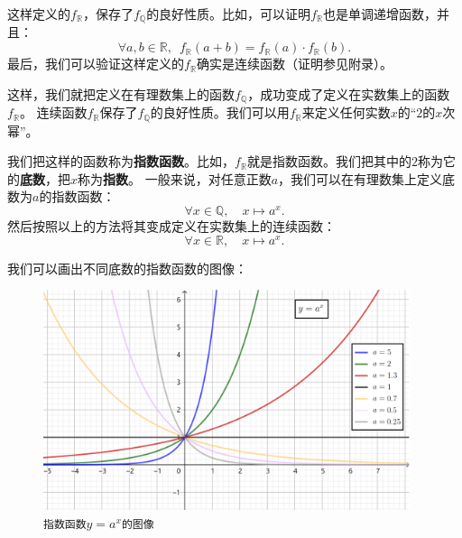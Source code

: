 \documentclass[12pt,UTF8]{ctexbook}
\begin{document}
这样定义的$f_{\mathbb{R}}$，保存了$f_{\mathbb{Q}}$的良好性质。比如，可以证明$f_{\mathbb{R}}$也是单调递增函数，并且：
$$ \forall a, b \in \mathbb{R}, \,\,\, f_{\mathbb{R}}(a + b) = f_{\mathbb{R}}(a) \cdot f_{\mathbb{R}}(b).$$
最后，我们可以验证这样定义的$f_{\mathbb{R}}$确实是连续函数（证明参见附录）。

这样，我们就把定义在有理数集上的函数$f_{\mathbb{Q}}$，成功变成了定义在实数集上的函数$f_{\mathbb{R}}$。
连续函数$f_{\mathbb{R}}$保存了$f_{\mathbb{Q}}$的良好性质。我们可以用$f_{\mathbb{R}}$来定义任何实数$x$的“$2$的$x$次幂”。

我们把这样的函数称为\textbf{指数函数}。比如，$f_{\mathbb{R}}$就是指数函数。我们把其中的$2$称为它的\textbf{底数}，把$x$称为\textbf{指数}。
一般来说，对任意正数$a$，我们可以在有理数集上定义底数为$a$的指数函数：
$$ \forall x\in\mathbb{Q}, \quad x\mapsto a^x.$$
然后按照以上的方法将其变成定义在实数集上的连续函数：
$$ \forall x\in\mathbb{R}, \quad x\mapsto a^x.$$

我们可以画出不同底数的指数函数的图像：

\begin{figure}[h]
    \vspace{4pt}
    \centering
    \includegraphics[width=0.96\textwidth]{指数函数1.png}
    \caption*{\texttt{指数函数}$y = a^x$\texttt{的图像}}
\end{figure}
\end{document}
